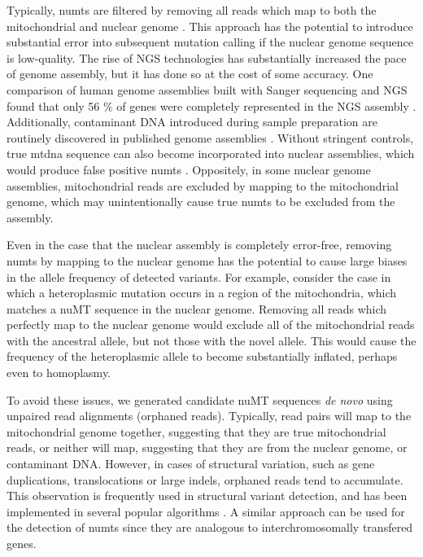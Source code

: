\documentclass[12pt,twoside]{reedthesis}
\begin{document}
Typically, \gls{numts} are filtered by removing all reads which map to both the mitochondrial and nuclear genome \citep{saxer_whole_2012, guo_very_2013, ye_high-throughput_2014}.
This approach has the potential to introduce substantial error into subsequent mutation calling if the nuclear genome sequence is low-quality.
The rise of \gls{NGS} technologies has substantially increased the pace of genome assembly, but it has done so at the cost of some accuracy.
One comparison of human genome assemblies built with Sanger sequencing and \gls{NGS} found that only 56 \% of genes were completely represented in the \gls{NGS} assembly \citep{alkan_limitations_2011}.
Additionally, contaminant DNA introduced during sample preparation are routinely discovered in published genome assemblies \citep{percudani_microbial_2013, strong_microbial_2014, koutsovoulos_genome_2015}.
Without stringent controls, true \gls{mtdna} sequence can also become incorporated into nuclear assemblies, which would produce false positive \gls{numts} \citep{hlaing_mitochondrial_2009, haridas_biologists_2011}.
Oppositely, in some nuclear genome assemblies, mitochondrial reads are excluded by mapping to the mitochondrial genome, which may unintentionally cause true \gls{numts} to be excluded from the assembly.

Even in the case that the nuclear assembly is completely error-free, removing \gls{numts} by mapping to the nuclear genome has the potential to cause large biases in the allele frequency of detected variants.
For example, consider the case in which a heteroplasmic mutation occurs in a region of the mitochondria, which matches a nuMT sequence in the nuclear genome.
Removing all reads which perfectly map to the nuclear genome would exclude all of the mitochondrial reads with the ancestral allele, but not those with the novel allele. 
This would cause the frequency of the heteroplasmic allele to become substantially inflated, perhaps even to homoplasmy.

To avoid these issues, we generated candidate nuMT sequences \textit{de novo} using unpaired read alignments (orphaned reads).
Typically, read pairs will map to the mitochondrial genome together, suggesting that they are true mitochondrial reads, or neither will map, suggesting that they are from the nuclear genome, or contaminant DNA.
However, in cases of structural variation, such as gene duplications, translocations or large \gls{indels}, orphaned reads tend to accumulate. 
This observation is frequently used in structural variant detection, and has been implemented in several popular algorithms \citep{medvedev_detecting_2010, jiang_PRISM:_2012, koboldt_massively_2012, schroder_socrates:_2014}.
A similar approach can be used for the detection of \gls{numts} since they are analogous to interchromosomally transfered genes.
\end{document}
